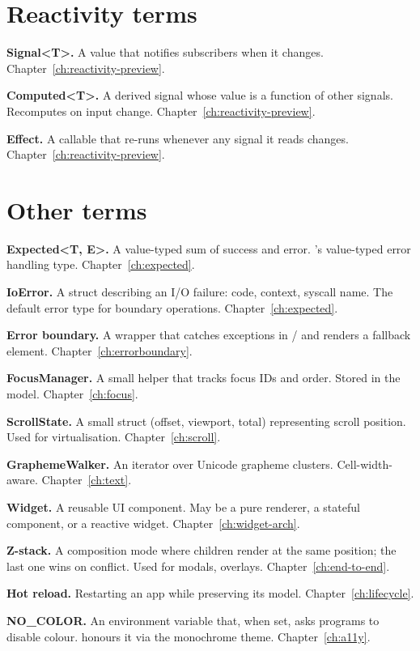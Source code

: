 \section{Reactivity terms}

\textbf{Signal<T>.} A value that notifies subscribers when it
changes. Chapter~\ref{ch:reactivity-preview}.

\textbf{Computed<T>.} A derived signal whose value is a
function of other signals. Recomputes on input change.
Chapter~\ref{ch:reactivity-preview}.

\textbf{Effect.} A callable that re-runs whenever any signal it
reads changes. Chapter~\ref{ch:reactivity-preview}.

\section{Other terms}

\textbf{Expected<T, E>.} A value-typed sum of success and
error. \maya{}'s value-typed error handling type.
Chapter~\ref{ch:expected}.

\textbf{IoError.} A struct describing an I/O failure: code,
context, syscall name. The default error type for boundary
operations. Chapter~\ref{ch:expected}.

\textbf{Error boundary.} A wrapper that catches exceptions in
/ and renders a fallback element.
Chapter~\ref{ch:errorboundary}.

\textbf{FocusManager.} A small helper that tracks focus IDs
and order. Stored in the model.
Chapter~\ref{ch:focus}.

\textbf{ScrollState.} A small struct (offset, viewport,
total) representing scroll position. Used for virtualisation.
Chapter~\ref{ch:scroll}.

\textbf{GraphemeWalker.} An iterator over Unicode grapheme
clusters. Cell-width-aware. Chapter~\ref{ch:text}.

\textbf{Widget.} A reusable UI component. May be a pure
renderer, a stateful component, or a reactive widget.
Chapter~\ref{ch:widget-arch}.

\textbf{Z-stack.} A composition mode where children render at
the same position; the last one wins on conflict. Used for
modals, overlays. Chapter~\ref{ch:end-to-end}.

\textbf{Hot reload.} Restarting an app while preserving its
model. Chapter~\ref{ch:lifecycle}.

\textbf{NO\_COLOR.} An environment variable that, when set,
asks programs to disable colour. \maya{} honours it via the
monochrome theme. Chapter~\ref{ch:a11y}.

